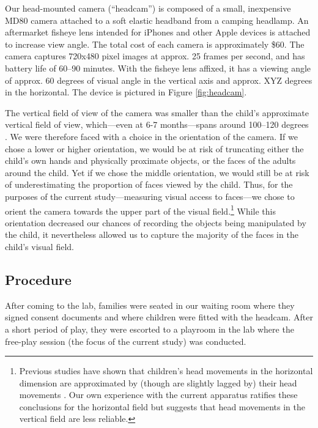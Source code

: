 \documentclass[10pt,letterpaper]{article}
\begin{document}
Our head-mounted camera (``headcam'') is composed of a small, inexpensive MD80 camera attached to a soft elastic headband from a camping headlamp. An aftermarket fisheye lens intended for iPhones and other Apple devices is attached to increase view angle. The total cost of each camera is approximately \$60. The camera captures 720x480 pixel images at approx. 25 frames per second, and has battery life of 60--90 minutes. With the fisheye lens affixed, it has a viewing angle of approx. 60 degrees of visual angle in the vertical axis and approx. XYZ degrees in the horizontal. The device is pictured in Figure \ref{fig:headcam}.

The vertical field of view of the camera was smaller than the child's approximate vertical field of view, which---even at 6-7 months---spans around 100--120 degrees \cite{mayer1988,cummings1988}. We were therefore faced with a choice in the orientation of the camera. If we chose a lower or higher orientation, we would be at risk of truncating either the child's own hands and physically proximate objects, or the faces of the adults around the child. Yet if we chose the middle orientation, we would still be at risk of underestimating the proportion of faces viewed by the child. Thus, for the purposes of the current study---measuring visual access to faces---we chose to orient the camera towards the upper part of the visual field.\footnote{Previous studies have shown that children's head movements in the horizontal dimension are approximated by (though are slightly lagged by) their head movements \cite{yoshida2008}. Our own experience with the current apparatus ratifies these conclusions for the horizontal field but suggests that head movements in the vertical field are less reliable.} While this orientation decreased our chances of recording the objects being manipulated by the child, it nevertheless allowed us to capture the majority of the faces in the child's visual field.

\subsection{Procedure}



After coming to the lab, families were seated in our waiting room where they signed consent documents and where children were fitted with the headcam. After a short period of play, they were escorted to a playroom in the lab where the free-play session (the focus of the current study) was conducted. 
\end{document}
